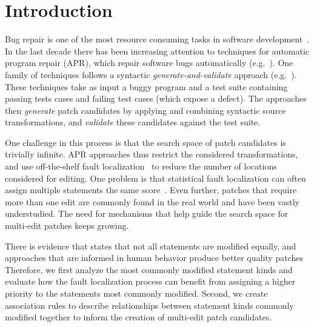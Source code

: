 \documentclass[sigconf]{acmart}
\begin{document}

\maketitle

\section{Introduction}

Bug repair is one of the most resource consuming tasks in 
software development~\cite{Weiss07,Tassey02,Britton13}.
In the last decade there has been increasing attention to 
techniques for automatic program repair (APR), which 
repair software bugs
automatically (e.g.~\cite{legoues12,kim2013,Weimer13,long16proph}).
One family of techniques follows a syntactic \emph{generate-and-validate}
approach (e.g.~\cite{legoues12,kim2013,Qi13TrpAutoR,xuan16}). These techniques
take as input a buggy program and a test suite containing
passing tests cases and failing test cases (which expose a defect).
The approaches then \emph{generate} 
patch candidates by applying and combining syntactic source transformations, and 
\emph{validate} these 
candidates against the test suite.

One challenge in this process is that the search space
of patch candidates is trivially infinite.  APR approaches thus restrict the
considered transformations, and use off-the-shelf fault
localization~\cite{legoues12} to reduce the number of locations considered for
editing. One problem is that 
statistical fault localization can often assign multiple statements
the same score~\cite{Jones02}. Even further, patches that require
more than one edit are commonly found in the real world and have
been vastly understudied. The need for mechanisms that help guide
the search space for multi-edit patches keeps growing.

There is evidence that states that not all statements are modified
equally, and approaches that are informed in human behavior produce
better quality patches~\cite{kim2013,Soto18} 
Therefore, we first analyze the most commonly 
modified statement kinds and evaluate how the 
fault localization process can benefit from assigning
a higher priority to the statements most commonly modified.
Second, we create association rules to describe relationships
between statement kinds commonly modified together to inform
the creation of multi-edit patch candidates. 
\end{document}
